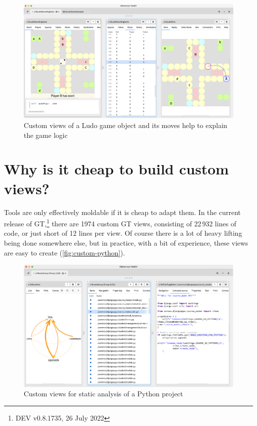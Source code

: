 \documentclass[conference]{IEEEtran}
\newcommand{\figlabel}[1]{\label{fig:#1}}
\begin{document}
\begin{figure}[htbp]
  \centering
  \includegraphics[width=\columnwidth]{figures/custom-views.png}
  \caption{Custom views of a Ludo game object and its moves help to explain the game logic}
  \figlabel{custom-views}
\end{figure}

\section*{Why is it cheap to build custom views?}

Tools are only effectively moldable if it is cheap to adapt them.
In the current release of GT,\footnote{DEV v0.8.1735, 26 July 2022} there are 1974 custom GT views, consisting of 22\,932 lines of code, or just short of 12 lines per view.
Of course there is a lot of heavy lifting being done somewhere else, but in practice, with a bit of experience, these views are easy to create (\autoref{fig:custom-python}).

\begin{figure}[htbp]
  \centering
  \includegraphics[width=\columnwidth]{figures/gtr-edx-dependencies-source.png}
  \caption{Custom views for static analysis of a Python project}
  \figlabel{custom-python}
\end{figure}
\end{document}
